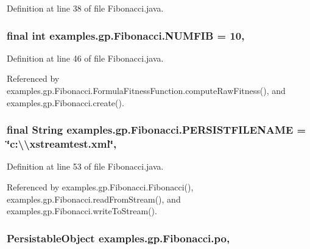 Definition at line 38 of file Fibonacci.\-java.

\hypertarget{classexamples_1_1gp_1_1_fibonacci_a6915862fb14c91fe68fc43eea804474a}{
\subsubsection[{N\-U\-M\-F\-I\-B}]{\setlength{\rightskip}{0pt plus 5cm}final int examples.\-gp.\-Fibonacci.\-N\-U\-M\-F\-I\-B = 10\hspace{0.3cm}{\ttfamily [static]}, {\ttfamily [private]}}}\label{classexamples_1_1gp_1_1_fibonacci_a6915862fb14c91fe68fc43eea804474a}


Definition at line 46 of file Fibonacci.\-java.



Referenced by examples.\-gp.\-Fibonacci.\-Formula\-Fitness\-Function.\-compute\-Raw\-Fitness(), and examples.\-gp.\-Fibonacci.\-create().

\hypertarget{classexamples_1_1gp_1_1_fibonacci_a9d97209b03872bbaa745ff440aa53ea4}{
\subsubsection[{P\-E\-R\-S\-I\-S\-T\-F\-I\-L\-E\-N\-A\-M\-E}]{\setlength{\rightskip}{0pt plus 5cm}final String examples.\-gp.\-Fibonacci.\-P\-E\-R\-S\-I\-S\-T\-F\-I\-L\-E\-N\-A\-M\-E = \char`\"{}c\-:\textbackslash{}\textbackslash{}xstreamtest.\-xml\char`\"{}\hspace{0.3cm}{\ttfamily [static]}, {\ttfamily [private]}}}\label{classexamples_1_1gp_1_1_fibonacci_a9d97209b03872bbaa745ff440aa53ea4}


Definition at line 53 of file Fibonacci.\-java.



Referenced by examples.\-gp.\-Fibonacci.\-Fibonacci(), examples.\-gp.\-Fibonacci.\-read\-From\-Stream(), and examples.\-gp.\-Fibonacci.\-write\-To\-Stream().

\hypertarget{classexamples_1_1gp_1_1_fibonacci_a1e9780538a5848eca991e0e3600f40e5}{
\subsubsection[{po}]{\setlength{\rightskip}{0pt plus 5cm}Persistable\-Object examples.\-gp.\-Fibonacci.\-po\hspace{0.3cm}{\ttfamily [static]}, {\ttfamily [private]}}}\label{classexamples_1_1gp_1_1_fibonacci_a1e9780538a5848eca991e0e3600f40e5}


